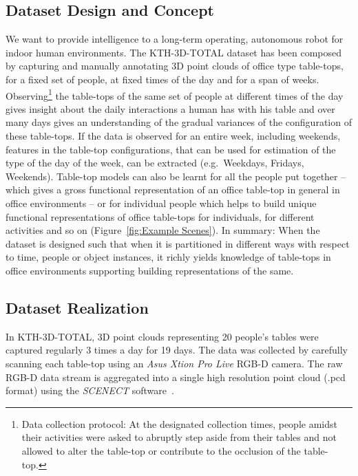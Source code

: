 \documentclass[letterpaper, 10 pt, conference]{ieeeconf}  %
\begin{document}
\subsection{Dataset Design and Concept}
\label{ssec:Dataset Design and Concept}
We want to provide intelligence to a long-term operating, autonomous 
robot for indoor human environments. The KTH-3D-TOTAL dataset has 
been composed by capturing and manually annotating 3D point clouds 
of office type table-tops, for a fixed set of people, at fixed times of the 
day and for a span of weeks. Observing\footnote{Data collection protocol: At the 
designated collection times, people amidst their activities were asked to abruptly step 
aside from their tables and not allowed to alter the table-top or contribute to the 
occlusion of the table-top.} the table-tops of the same set of people at 
different times of the day gives insight about the daily interactions a 
human has with his table and over many days gives an understanding of the gradual 
variances of the configuration of these table-tops. If the data is observed for an entire week, 
including weekends, features in the table-top configurations, 
that can be used for estimation of the type of the day of the week, 
can be extracted (e.g.\ Weekdays, Fridays, Weekends). Table-top models can 
also be learnt for all the people put together -- which gives a gross functional
representation of an office table-top in general in office environments -- 
or for individual people which helps to build unique functional representations of 
office table-tops for individuals, for different activities and so on 
(Figure~\ref{fig:Example Scenes}). 
In summary: When the dataset is designed such that when it is partitioned in different ways with respect to time, people or object instances, it richly yields knowledge 
of table-tops in office environments supporting building representations of the same.

\subsection{Dataset Realization}
\label{ssec:Dataset Realization}
In KTH-3D-TOTAL, 3D point clouds representing 20 people's tables were captured regularly 3 times a day for 19 days. The data was collected by 
carefully scanning each table-top using an \textit{Asus Xtion Pro Live} RGB-D camera. The raw RGB-D data stream is aggregated into a single 
high resolution point cloud (.pcd format) using the \textit{SCENECT} software~\cite{Buerkler:Online2012}.
\end{document}
